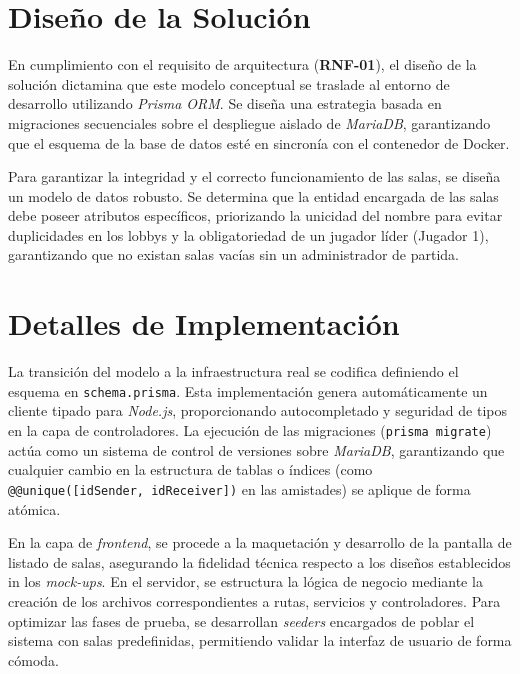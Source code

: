 \section{Diseño de la Solución}
En cumplimiento con el requisito de arquitectura (\textbf{RNF-01}), el diseño de la solución dictamina que este modelo conceptual se traslade al entorno de desarrollo utilizando \textit{Prisma ORM}. Se diseña una estrategia basada en migraciones secuenciales sobre el despliegue aislado de \textit{MariaDB}, garantizando que el esquema de la base de datos esté en sincronía con el contenedor de Docker.

Para garantizar la integridad y el correcto funcionamiento de las salas, se diseña un modelo de datos robusto. Se determina que la entidad encargada de las salas debe poseer atributos específicos, priorizando la unicidad del nombre para evitar duplicidades en los lobbys y la obligatoriedad de un jugador líder (Jugador 1), garantizando que no existan salas vacías sin un administrador de partida.

\section{Detalles de Implementación}
La transición del modelo a la infraestructura real se codifica definiendo el esquema en \texttt{schema.prisma}. Esta implementación genera automáticamente un cliente tipado para \textit{Node.js}, proporcionando autocompletado y seguridad de tipos en la capa de controladores. La ejecución de las migraciones (\texttt{prisma migrate}) actúa como un sistema de control de versiones sobre \textit{MariaDB}, garantizando que cualquier cambio en la estructura de tablas o índices (como \texttt{@@unique([idSender, idReceiver])} en las amistades) se aplique de forma atómica.

En la capa de \textit{frontend}, se procede a la maquetación y desarrollo de la pantalla de listado de salas, asegurando la fidelidad técnica respecto a los diseños establecidos in los \textit{mock-ups}. En el servidor, se estructura la lógica de negocio mediante la creación de los archivos correspondientes a rutas, servicios y controladores. Para optimizar las fases de prueba, se desarrollan \textit{seeders} encargados de poblar el sistema con salas predefinidas, permitiendo validar la interfaz de usuario de forma cómoda.

